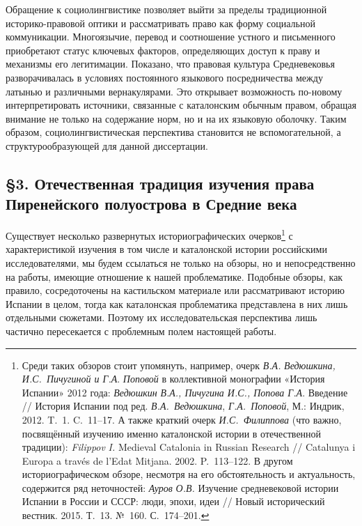 Обращение к социолингвистике позволяет выйти за пределы традиционной историко-правовой оптики и рассматривать право как форму социальной коммуникации. Многоязычие, перевод и соотношение устного и письменного приобретают статус ключевых факторов, определяющих доступ к праву и механизмы его легитимации. Показано, что правовая культура Средневековья разворачивалась в условиях постоянного языкового посредничества между латынью и различными вернакулярами. Это открывает возможность по-новому интерпретировать источники, связанные с каталонским обычным правом, обращая внимание не только на содержание норм, но и на их языковую оболочку. Таким образом, социолингвистическая перспектива становится не вспомогательной, а структурообразующей для данной диссертации.

\subsection*{§3. Отечественная традиция изучения права Пиренейского полуострова в Средние века}

Существует несколько развернутых историографических очерков\footnote{Среди таких обзоров стоит упомянуть, например, очерк \emph{В.А. }\emph{Ведюшкина}\emph{, И.С.~Пичугиной и Г.А}. \emph{Поповой }в коллективной монографии «История Испании» 2012 года: \emph{Ведюшкин}\emph{ В.А., Пичугина И.С., Попова Г.А}. Введение // История Испании под ред. \emph{В.А.~Ведюшкина}, \emph{Г.А.~Поповой}, М.: Индрик, 2012. T.~1. C.~11--17. А также краткий очерк \emph{И.С.~Филиппова} (что важно, посвящённый изучению именно каталонской истории в отечественной традиции): \emph{Filippov}\emph{ I. }Medieval Catalonia in Russian Research // Catalunya i Europa a través de l’Edat Mitjana. 2002. P.~113--122. В другом историографическом обзоре, несмотря на его обстоятельность и актуальность, содержится ряд неточностей: \emph{Ауров}\emph{ О.В.} Изучение средневековой истории Испании в России и СССР: люди, эпохи, идеи // Новый исторический вестник. 2015. Т.~13. №~160. С.~174--201.} с характеристикой изучения в том числе и каталонской истории российскими исследователями, мы будем ссылаться не только на обзоры, но и непосредственно на работы, имеющие отношение к нашей проблематике. Подобные обзоры, как правило, сосредоточены на кастильском материале или рассматривают историю Испании в целом, тогда как каталонская проблематика представлена в них лишь отдельными сюжетами. Поэтому их исследовательская перспектива лишь частично пересекается с проблемным полем настоящей работы.


